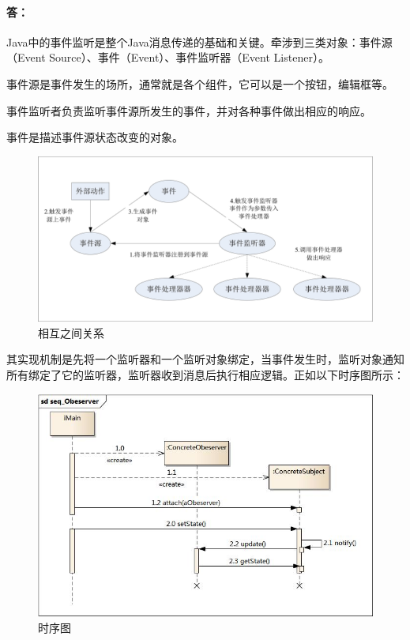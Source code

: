 \paragraph{答：}
Java中的事件监听是整个Java消息传递的基础和关键。牵涉到三类对象：事件源（Event Source）、事件（Event）、事件监听器（Event Listener）。 

事件源是事件发生的场所，通常就是各个组件，它可以是一个按钮，编辑框等。 

事件监听者负责监听事件源所发生的事件，并对各种事件做出相应的响应。 

事件是描述事件源状态改变的对象。 

\begin{figure}[H]
	\centering
	\includegraphics[width=\textwidth]{1.jpg}
	\caption{相互之间关系}
\end{figure}

其实现机制是先将一个监听器和一个监听对象绑定，当事件发生时，监听对象通知所有绑定了它的监听器，监听器收到消息后执行相应逻辑。正如以下时序图所示：

\begin{figure}[H]
	\centering
	\includegraphics[width=\textwidth]{2.jpg}
	\caption{时序图}
\end{figure}

